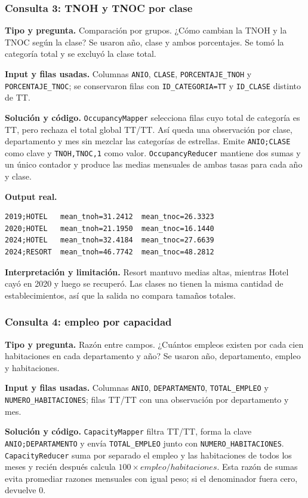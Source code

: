 \documentclass[10pt,a4paper]{article}
\theoremstyle{definition}
\begin{document}
\subsubsection{Consulta 3: TNOH y TNOC por clase}
\textbf{Tipo y pregunta.} Comparación por grupos. ¿Cómo cambian la TNOH y la
TNOC según la clase? Se usaron año, clase y ambos porcentajes. Se tomó la
categoría total y se excluyó la clase total.

\textbf{Input y filas usadas.} Columnas \texttt{ANIO}, \texttt{CLASE},
\texttt{PORCENTAJE\_TNOH} y \texttt{PORCENTAJE\_TNOC}; se conservaron filas con
\texttt{ID\_CATEGORIA=TT} y \texttt{ID\_CLASE} distinto de TT.

\textbf{Solución y código.} \texttt{OccupancyMapper} selecciona filas cuyo total
de categoría es TT, pero rechaza el total global TT/TT. Así queda una
observación por clase, departamento y mes sin mezclar las categorías de
estrellas. Emite \texttt{ANIO;CLASE} como clave y
\texttt{TNOH,TNOC,1} como valor. \texttt{OccupancyReducer} mantiene dos sumas y
un único contador y produce las medias mensuales de ambas tasas para cada año y
clase.

\textbf{Output real.}
\begin{lstlisting}[style=resultado]
2019;HOTEL   mean_tnoh=31.2412  mean_tnoc=26.3323
2020;HOTEL   mean_tnoh=21.1950  mean_tnoc=16.1440
2024;HOTEL   mean_tnoh=32.4184  mean_tnoc=27.6639
2024;RESORT  mean_tnoh=46.7742  mean_tnoc=48.2812
\end{lstlisting}
\textbf{Interpretación y limitación.} Resort mantuvo medias altas, mientras
Hotel cayó en 2020 y luego se recuperó. Las clases no tienen la misma cantidad
de establecimientos, así que la salida no compara tamaños totales.

\subsubsection{Consulta 4: empleo por capacidad}
\textbf{Tipo y pregunta.} Razón entre campos. ¿Cuántos empleos existen por cada
cien habitaciones en cada departamento y año? Se usaron año, departamento,
empleo y habitaciones.

\textbf{Input y filas usadas.} Columnas \texttt{ANIO}, \texttt{DEPARTAMENTO},
\texttt{TOTAL\_EMPLEO} y \texttt{NUMERO\_HABITACIONES}; filas TT/TT con una
observación por departamento y mes.

\textbf{Solución y código.} \texttt{CapacityMapper} filtra TT/TT, forma la clave
\texttt{ANIO;DEPARTAMENTO} y envía \texttt{TOTAL\_EMPLEO} junto con
\texttt{NUMERO\_HABITACIONES}. \texttt{CapacityReducer} suma por separado el
empleo y las habitaciones de todos los meses y recién después calcula
$100\times empleo/habitaciones$. Esta razón de sumas evita promediar razones
mensuales con igual peso; si el denominador fuera cero, devuelve 0.
\end{document}
